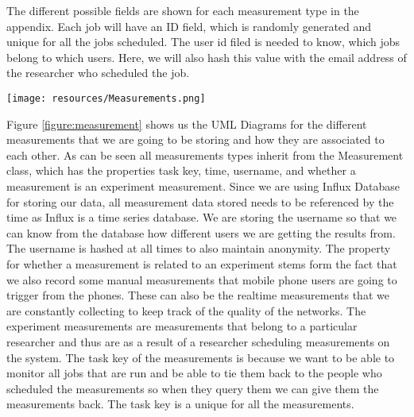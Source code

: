 The different possible fields are shown for each measurement type in the appendix.
Each job will have an ID field, which is randomly generated and unique for all the jobs scheduled.
The user id filed is needed to know, which jobs belong to which users.
Here, we will also hash this value with the email address of the researcher who scheduled the job.
\begin{figure*}
    \begin{center}
        \texttt{[image: resources/Measurements.png]}
    \end{center}
    \caption{Showing UML class diagrams of the different types of measurements and their associations.}
    \label{figure:measurement}
\end{figure*}

Figure \ref{figure:measurement} shows us the UML Diagrams for the different measurements that we are going to be storing and how they are associated to each other.
As can be seen all measurements types inherit from the Measurement class, which has the properties task key, time, username, and whether a measurement is an experiment measurement.
Since we are using Influx Database for storing our data, all measurement data stored needs to be referenced by the time as Influx is a time series database.
We are storing the username so that we can know from the database how different users we are getting the results from.
The username is hashed at all times to also maintain anonymity.
The property for whether a measurement is related to an experiment stems form the fact that we also record some manual measurements that mobile phone users are going to trigger from the phones.
These can also be the realtime measurements that we are constantly collecting to keep track of the quality of the networks.
The experiment measurements are measurements that belong to a particular researcher and thus are as a result of a researcher scheduling measurements on the system.
The task key of the measurements is because we want to be able to monitor all jobs that are run and be able to tie them back to the people who scheduled the measurements so when they query them we can give them the measurements back.
The task key is a unique for all the measurements.

